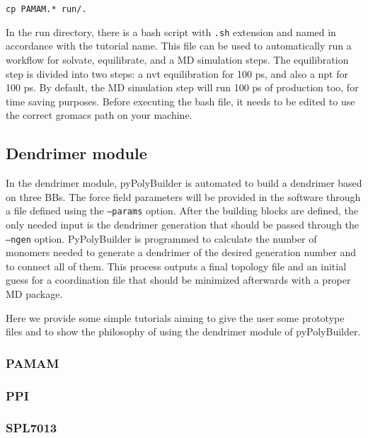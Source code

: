 \documentclass[12pt]{article}
\begin{document}
\begin{lstlisting}
cp PAMAM.* run/.
\end{lstlisting}

In the run directory, there is a bash script with \texttt{.sh} extension and named in accordance with the tutorial name.
This file can be used to automatically run a workflow for solvate, equilibrate, and a MD simulation steps.
The equilibration step is divided into two steps: a nvt equilibration for 100 ps, and also a npt for 100 ps.
By default, the MD simulation step will run 100 ps of production too, for time saving purposes.
Before executing the bash file, it needs to be edited to use the correct gromacs path on your machine.

\subsection{Dendrimer module}
In the dendrimer module, pyPolyBuilder is automated to build a dendrimer based on three BBs.
The force field parameters will be provided in the software through a file defined using the \texttt{--params} option.
After the building blocks are defined, the only needed input is the dendrimer generation that should be passed through the \texttt{--ngen} option.
PyPolyBuilder is programmed to calculate the number of monomers needed to generate a dendrimer of the desired generation number and to connect all of them.
This process outputs a final topology file and an initial guess for a coordination file that should be minimized afterwards with a proper MD package.

Here we provide some simple tutorials aiming to give the user some prototype files and to show the philosophy of using the dendrimer module of pyPolyBuilder.

\subsubsection{PAMAM}

\clearpage

\subsubsection{PPI}

\clearpage

\subsubsection{SPL7013}

\clearpage
\end{document}
